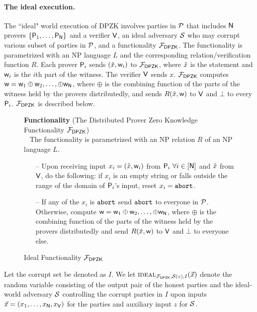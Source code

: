 \paragraph{The ideal execution.} The ``ideal" world execution of DPZK  involves parties in $\mathcal{P}$ that includes $\mathsf{N}$ provers $\{\mathsf{P}_1, \ldots, \mathsf{P}_{\mathsf{N}}\}$ and a verifier $\mathsf{V}$,  an ideal adversary $\mathcal{S}$ who may corrupt various subset of parties in $\mathcal{P}$, and a  functionality $\mathcal{F}_{\mathsf{DPZK}}$.  The functionality is parametrized with an  NP language $L$ and  the corresponding relation/verification function $R$. Each prover $\mathsf{P}_i$ sends $(\hat{x},\mathsf{w}_i)$ to $\mathcal{F}_{\mathsf{DPZK}}$, where $\hat{x}$ is the statement and $\mathsf{w}_i$ is the $i$th part of the witness. The verifier $\mathsf{V}$ sends $x$.  $\mathcal{F}_{\mathsf{DPZK}}$ computes $\mathsf{w} = \mathsf{w}_1 \oplus \mathsf{w}_2,\ldots,\oplus \mathsf{w}_{\mathsf{N}}$, where $\oplus$ is the combining function of the parts of the witness held by the provers distributedly, and sends $R(\hat{x},\mathsf{w})$ to $\mathsf{V}$ and $\bot$ to every $\mathsf{P}_i$. $\mathcal{F}_{\mathsf{DPZK}}$  is described below. 
\begin{figure}[H]
	\centering
	\begin{framed}
		\textbf{Functionality} (The Distributed Prover Zero Knowledge Functionality $\mathcal{F}_{\mathsf{DPZK}}$)\\~
		The functionality is parametrized with an NP relation $R$ of an NP language $L$.
		\begin{itemize}
		\item[--] Upon receiving input $x_i = (\hat{x}, \mathsf{w}_i)$ from $\mathsf{P}_i$ $\forall i\in[\mathsf{N}]$ and $\hat{x}$ from $\mathsf{V}$, do the following: if $x_i$ is an empty string or falls outside the range of the domain of $\mathsf{P}_i$'s input,  reset $x_i = \texttt{abort}$. 
			\item[--] If any of the $x_i$ is $\texttt{abort}$ send $\texttt{abort}$ to everyone in $\mathcal{P}$. Otherwise,   compute $\mathsf{w} = \mathsf{w}_1 \oplus \mathsf{w}_2,\ldots, \oplus \mathsf{w}_{\mathsf{N}}$, where $\oplus$ is the combining function of the parts of the witness held by the provers distributedly and send $R(\hat{x}, \mathsf{w})$ to $\mathsf{V}$ and $\bot$ to everyone else. 
		\end{itemize}
	\end{framed}
	\caption{Ideal Functionality $\mathcal{F}_{\mathsf{DPZK}}$}
\end{figure} \label{func:DPZK}

Let the corrupt set be denoted as $I$. We let $\textsc{ideal}_{\mathcal{F}_{\mathsf{DPZK}}, \mathcal{S}(z),I}(\vec{x})$ denote the random variable consisting of the output pair of the honest parties and the ideal-world adversary $\mathcal{S}$ controlling the corrupt parties in $I$ upon inputs $\vec{x} = (x_1  ,\ldots,x_{\mathsf{N}},x_{\mathsf{V}})$ for the parties and auxiliary input $z$ for $\mathcal{S}$.  


